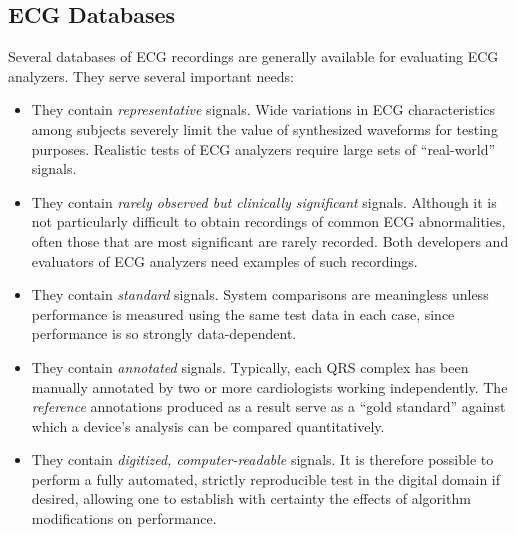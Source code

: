 \subsection{ECG Databases}
Several databases of ECG recordings are generally available
for evaluating ECG analyzers.  They serve several important needs:
\begin{itemize}
   \item  They contain {\em representative} signals.  Wide variations in
ECG characteristics among subjects severely limit the value of
synthesized waveforms for testing purposes.  Realistic tests of ECG
analyzers require large sets of ``real-world'' signals.

   \item They contain {\em rarely observed but clinically significant}
signals.  Although it is not particularly difficult to obtain
recordings of common ECG abnormalities, often those that are most
significant are rarely recorded.  Both developers and evaluators of
ECG analyzers need examples of such recordings.

   \item  They contain {\em standard} signals.  System comparisons
are meaningless unless performance is measured using the same test
data in each case, since performance is so strongly data-dependent.

   \item  They contain {\em annotated} signals.  Typically, each QRS
complex has been manually annotated by two or more cardiologists
working independently.  The {\em reference} annotations produced
as a result serve as a ``gold standard'' against which a device's
analysis can be compared quantitatively.

   \item They contain {\em digitized, computer-readable} signals.  It is
therefore possible to perform a fully automated, strictly reproducible
test in the digital domain if desired, allowing one to establish with
certainty the effects of algorithm modifications on performance.
\end{itemize}

